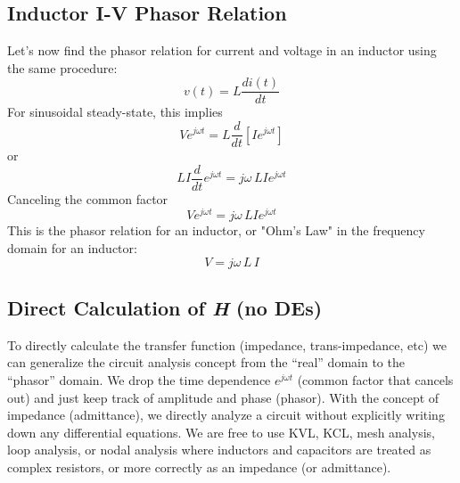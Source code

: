 \subsection{Inductor I-V Phasor Relation}
Let's now find the phasor relation for current and voltage in an inductor using the same procedure:
    \begin{equation}
        v(t) = L\frac{{di(t)}}{{dt}}
    \end{equation} 
For sinusoidal steady-state, this implies
    \begin{equation}
        V{e^{j\omega t}} = L\frac{d}{{dt}}[I{e^{j\omega t}}]
    \end{equation}
or
    \begin{equation}
        LI\frac{d}{{dt}}{e^{j\omega t}} = j\omega \,LI{e^{j\omega t}}
    \end{equation}
Canceling the common factor
    \begin{equation}
        V{e^{j\omega t}} = j\omega \,LI{e^{j\omega t}}
    \end{equation}
This is the phasor relation for an inductor, or "Ohm's Law" in the frequency domain for an inductor:
    \begin{equation}
        V = j\omega \,L\,I
    \end{equation}
\subsection{Direct Calculation of \textit{H} (no DEs)}
To directly calculate the transfer function (impedance, trans-impedance, etc) we can generalize the circuit analysis concept from the “real” domain to the “phasor” domain.   We drop the time dependence $e^{j\omega t}$ (common factor that cancels out) and just keep track of amplitude and phase (phasor).  With the concept of impedance (admittance), we directly analyze a circuit without explicitly writing down any differential equations.  We are free to use KVL, KCL, mesh analysis, loop analysis, or nodal analysis where inductors and capacitors are treated as complex resistors, or more correctly as an impedance (or admittance).

